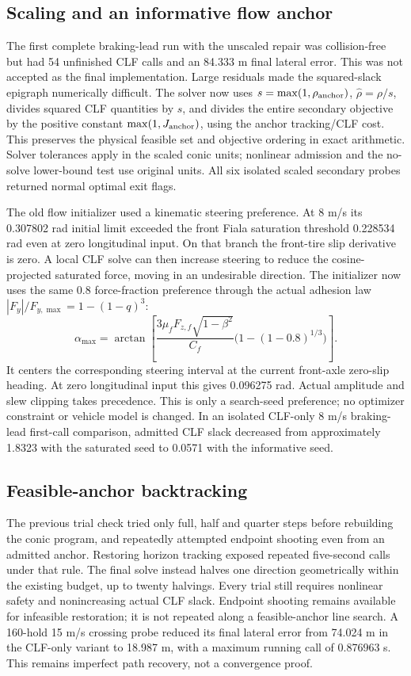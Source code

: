 \documentclass[11pt]{article}
\begin{document}
\subsection{Scaling and an informative flow anchor}
The first complete braking-lead run with the unscaled repair was collision-free
but had 54 unfinished CLF calls and an 84.333 m final lateral error. This was
not accepted as the final implementation. Large residuals made the squared-slack
epigraph numerically difficult. The solver now uses
$s=\max(1,\rho_{\rm anchor})$, $\widehat\rho=\rho/s$, divides squared CLF
quantities by $s$, and divides the entire secondary objective by the positive constant $\max(1,J_{\rm anchor})$, using the anchor tracking/CLF cost.
This preserves the physical feasible set and objective ordering in exact
arithmetic. Solver tolerances apply in the scaled conic units; nonlinear
admission and the no-solve lower-bound test use original units. All six isolated
scaled secondary probes returned normal optimal exit flags.

The old flow initializer used a kinematic steering preference. At 8 m/s its
0.307802 rad initial limit exceeded the front Fiala saturation threshold
0.228534 rad even at zero longitudinal input. On that branch the front-tire
slip derivative is zero. A local CLF solve can then increase steering to reduce
the cosine-projected saturated force, moving in an undesirable direction.
The initializer now uses the same 0.8 force-fraction preference through the
actual adhesion law $|F_y|/F_{y,\max}=1-(1-q)^3$:
\[
\alpha_{\max}=\arctan\left[
\frac{3\mu_fF_{z,f}\sqrt{1-\beta^2}}{C_f}
\big(1-(1-0.8)^{1/3}\big)\right].
\]
It centers the corresponding steering interval at the current front-axle
zero-slip heading. At zero longitudinal input this gives 0.096275 rad.
Actual amplitude and slew clipping takes precedence. This is only a search-seed
preference; no optimizer constraint or vehicle model is changed. In an isolated CLF-only
8 m/s braking-lead first-call comparison, admitted CLF slack decreased from approximately
1.8323 with the saturated seed to 0.0571 with the informative seed.

\subsection{Feasible-anchor backtracking}
The previous trial check tried only full, half and quarter steps before
rebuilding the conic program, and repeatedly attempted endpoint shooting even
from an admitted anchor. Restoring horizon tracking exposed repeated five-second
calls under that rule. The final solve instead halves one direction geometrically
within the existing budget, up to twenty halvings. Every trial still requires
nonlinear safety and nonincreasing actual CLF slack. Endpoint shooting remains
available for infeasible restoration; it is not repeated along a feasible-anchor
line search. A 160-hold 15 m/s crossing probe reduced its final lateral error
from 74.024 m in the CLF-only variant to 18.987 m, with a maximum running call of
0.876963 s. This remains imperfect path recovery, not a convergence proof.
\end{document}
